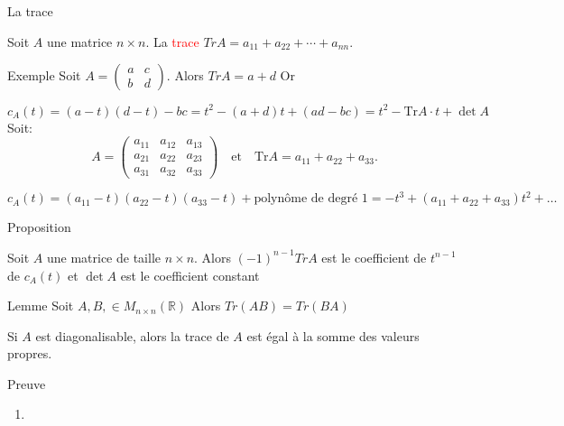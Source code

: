 \begin{parag}{La trace}
    \begin{defintion}
        Soit $A$ une matrice $n \times n$. La \textcolor{red}{trace} $Tr A = a_{11} + a_{22} + \cdots + a_{nn}$.
    \end{defintion}
    \begin{subparag}{Exemple}
        Soit $A = \begin{pmatrix}
            a & c \\ b & d
        \end{pmatrix}$. Alors $TrA = a + d$ Or

  \[
c_A(t) = (a - t)(d - t) - bc = t^2 - (a + d)t + (ad - bc) = t^2 - \text{Tr}A \cdot t + \det A
\]
Soit:
\[
A = 
\begin{pmatrix}
a_{11} & a_{12} & a_{13} \\
a_{21} & a_{22} & a_{23} \\
a_{31} & a_{32} & a_{33}
\end{pmatrix}
\quad \text{et} \quad \text{Tr}A = a_{11} + a_{22} + a_{33}.
\]

\[
c_A(t) = (a_{11} - t)(a_{22} - t)(a_{33} - t) + \text{polynôme de degré 1}
= -t^3 + (a_{11} + a_{22} + a_{33})t^2 + \dots
\]
    \end{subparag}
    \begin{subparag}{Proposition}
        \begin{theoreme}
            Soit $A$ une matrice de taille $n \times n$. Alors $(-1)^{n-1}TrA$ est le coefficient de $t^{n-1}$ de $c_A(t)$ et $\det A$ est le coefficient constant
        \end{theoreme}

        \begin{theoreme}{Lemme}
            Soit $A, B, \in M_{n \times n}(\mathbb{R}) $ Alors $Tr(AB) = Tr(BA)$
        \end{theoreme}
        \begin{theoreme}
            Si $A$ est diagonalisable, alors la trace de $A$ est égal à la somme des valeurs propres.
        \end{theoreme}
    \end{subparag}
    \begin{subparag}{Preuve}
        \begin{enumerate}
            \item 
            \begin{align*}
                

\end{align*}
\end{enumerate}
\end{subparag}
\end{parag}
